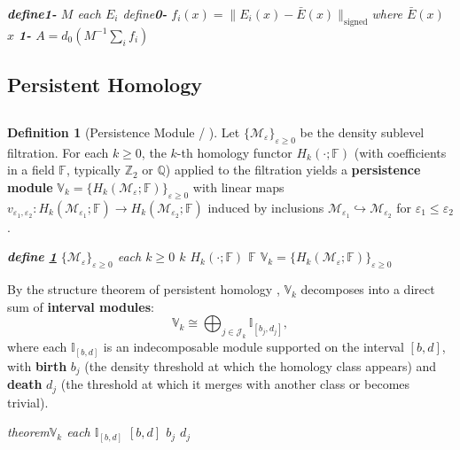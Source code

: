 \documentclass[11pt,a4paper]{article}
\theoremstyle{plain}
\theoremstyle{definition}
\newtheorem{definition}[theorem]{Definition}
\newcommand{\cM}{\mathcal{M}}
\begin{document}
\bigskip
\noindent
\textit{\textbf{define1-} $M$ each $E_i$ define\textbf{0-} $f_i(x) = \|E_i(x) - \bar{E}(x)\|_{\text{signed}}$where $\bar{E}(x)$  $x$ \textbf{1-} $A = d_0(M^{-1}\sum_i f_i)$}

\subsection{Persistent Homology}
\subsection*{}

\begin{definition}[Persistence Module / ]
\label{def:pers}
Let $\{\cM_{\varepsilon}\}_{\varepsilon \geq 0}$ be the density sublevel 
filtration. For each $k \geq 0$, the $k$-th homology functor $H_k(\cdot; \mathbb{F})$ 
(with coefficients in a field $\mathbb{F}$, typically $\mathbb{Z}_2$ or $\mathbb{Q}$) 
applied to the filtration yields a \textbf{persistence module} 
$\mathbb{V}_k = \{H_k(\cM_{\varepsilon}; \mathbb{F})\}_{\varepsilon \geq 0}$ 
with linear maps $v_{\varepsilon_1, \varepsilon_2}: H_k(\cM_{\varepsilon_1}; \mathbb{F}) 
\to H_k(\cM_{\varepsilon_2}; \mathbb{F})$ induced by inclusions 
$\cM_{\varepsilon_1} \hookrightarrow \cM_{\varepsilon_2}$ for 
$\varepsilon_1 \leq \varepsilon_2$.
\end{definition}

\bigskip
\noindent
\textit{\textbf{define \ref{def:pers}} $\{\cM_{\varepsilon}\}_{\varepsilon \geq 0}$ each $k \geq 0$ $k$  $H_k(\cdot; \mathbb{F})$ $\mathbb{F}$ \textbf{} $\mathbb{V}_k = \{H_k(\cM_{\varepsilon}; \mathbb{F})\}_{\varepsilon \geq 0}$}

By the structure theorem of persistent homology \cite{zomorodian2005, edelsbrunner2008}, 
$\mathbb{V}_k$ decomposes into a direct sum of \textbf{interval modules}:
\begin{equation}
  \mathbb{V}_k \cong \bigoplus_{j \in \mathcal{J}_k} \mathbb{I}_{[b_j, d_j]},
  \label{eq:interval_decomp}
\end{equation}
where each $\mathbb{I}_{[b, d]}$ is an indecomposable module supported on 
the interval $[b, d]$, with \textbf{birth} $b_j$ (the density threshold at 
which the homology class appears) and \textbf{death} $d_j$ (the threshold 
at which it merges with another class or becomes trivial).

\bigskip
\noindent
\textit{theorem$\mathbb{V}_k$ \textbf{}each $\mathbb{I}_{[b, d]}$  $[b, d]$ \textbf{} $b_j$\textbf{} $d_j$}
\end{document}
